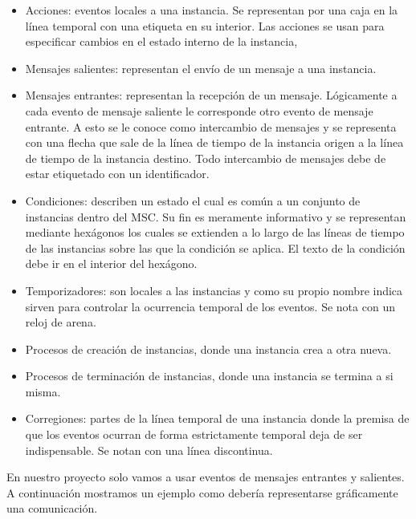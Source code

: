 \documentclass[12pt,a4paper]{report}
\begin{document}
\begin{itemize}
\item Acciones: eventos locales a una instancia. Se representan por una caja en la línea temporal con una etiqueta en su interior. Las acciones se usan para especificar cambios en el estado interno de la instancia,
\item Mensajes salientes: representan el envío de un mensaje a una instancia.
\item Mensajes entrantes: representan la recepción de un mensaje. Lógicamente a cada evento de mensaje saliente le corresponde otro evento de mensaje entrante. A esto se le conoce como intercambio de mensajes y se representa con una flecha que sale de la línea de tiempo de la instancia origen a la línea de tiempo de la instancia destino. Todo intercambio de mensajes debe de estar etiquetado con un identificador. 
\item Condiciones: describen un estado el cual es común a un conjunto de instancias dentro del MSC. Su fin es meramente informativo y se representan mediante hexágonos los cuales se extienden a lo largo de las líneas de tiempo de las instancias sobre las que la condición se aplica. El texto de la condición debe ir en el interior del hexágono.
\item Temporizadores: son locales a las instancias y como su propio nombre indica sirven para controlar la ocurrencia temporal de los eventos. Se nota con un reloj de arena.
\item Procesos de creación de instancias, donde una instancia crea a otra nueva.
\item Procesos de terminación de instancias, donde una instancia se termina a si misma.
\item Corregiones: partes de la línea temporal de una instancia donde la premisa de que los eventos ocurran de forma estrictamente temporal deja de ser indispensable. Se notan con una línea discontinua.
\end{itemize}

En nuestro proyecto solo vamos a usar eventos de mensajes entrantes y salientes. A continuación mostramos un ejemplo como debería representarse gráficamente una comunicación.
\end{document}
